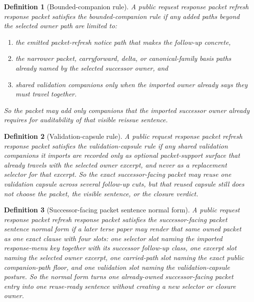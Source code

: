\documentclass[11pt]{article}
\newtheorem{definition}{Definition}
\begin{document}
\begin{definition}[Bounded-companion rule]
A public request response packet refresh response packet satisfies the \emph{bounded-companion rule} if any added paths beyond the selected owner path are limited to:
\begin{enumerate}[leftmargin=*]
\item the emitted packet-refresh notice path that makes the follow-up concrete,
\item the narrower packet, carryforward, delta, or canonical-family basis paths already named by the selected successor owner, and
\item shared validation companions only when the imported owner already says they must travel together.
\end{enumerate}
So the packet may add only companions that the imported successor owner already requires for auditability of that visible reissue sentence.
\end{definition}

\begin{definition}[Validation-capsule rule]
A public request response packet refresh response packet satisfies the \emph{validation-capsule rule} if any shared validation companions it imports are recorded only as optional packet-support surface that already travels with the selected owner excerpt, and never as a replacement selector for that excerpt. So the exact successor-facing packet may reuse one validation capsule across several follow-up cuts, but that reused capsule still does not choose the packet, the visible sentence, or the closure verdict.
\end{definition}

\begin{definition}[Successor-facing packet sentence normal form]
A public request response packet refresh response packet satisfies the \emph{successor-facing packet sentence normal form} if a later terse paper may render that same owned packet as one exact clause with four slots: one selector slot naming the imported response-menu key together with its successor follow-up class, one excerpt slot naming the selected owner excerpt, one carried-path slot naming the exact public companion-path floor, and one validation slot naming the validation-capsule posture.
So the normal form turns one already-owned successor-facing packet entry into one reuse-ready sentence without creating a new selector or closure owner.
\end{definition}
\end{document}
